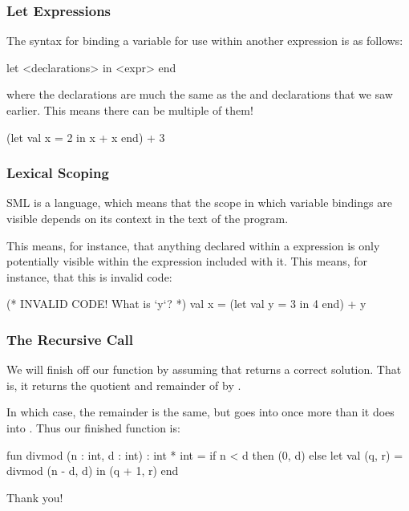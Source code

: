 \documentclass[aspectratio=169]{beamer}
\begin{document}
\begin{frame}[fragile]
  \frametitle{Let Expressions}

  {\small
  The syntax for binding a variable for use within another expression is as follows:

  \vspace{\fill}

  \begin{codeblock}
    let 
      <declarations>
    in 
      <expr>
    end
  \end{codeblock}

  where the declarations are much the same as the  and  declarations
  that we saw earlier. This means there can be multiple of them!

  \vspace{\fill}

  \begin{codeblock}
    (let 
      val x = 2
    in 
      x + x
    end) + 3
  \end{codeblock}
  }
\end{frame}

\begin{frame}[fragile]
  \frametitle{Lexical Scoping}

  SML is a  language, which means that the scope in which
  variable bindings are visible depends on its context in the text of the program.
  
  \vspace{\fill}

  This means, for instance, that anything declared within a  expression
  is only potentially visible within the expression included with it. This means,
  for instance, that this is invalid code: 

  \begin{codeblock}
    (* INVALID CODE! What is `y`? *)
    val x = 
      (let 
        val y = 3
      in 
        4 
      end) + y 
  \end{codeblock}
\end{frame}

\begin{frame}[fragile]
  \frametitle{The Recursive Call}

  We will finish off our function by assuming that 
  returns a correct solution. That is, it returns the quotient and remainder 
  of  by . 

  \vspace{\fill}

  In which case, the remainder is the same, but  goes into 
  once more than it does into . Thus our finished function is:

  \begin{codeblock}
    fun divmod (n : int, d : int) : int * int = 
      if n < d then
        (0, d)
      else
        let 
          val (q, r) = divmod (n - d, d) 
        in
          (q + 1, r)
        end
  \end{codeblock}
\end{frame}

\begin{frame}[plain]
	\begin{center} Thank you! \end{center}
\end{frame}
\end{document}

